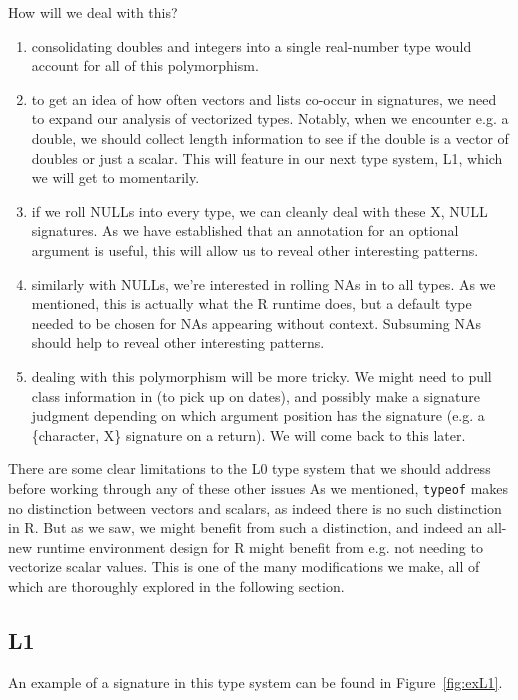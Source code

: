 \documentclass[acmsmall,10pt,review,anonymous]{acmart}\settopmatter{printfolios=true,printccs=false,printacmref=false}
\newcommand{\code}[1]{\lstinline|#1|\xspace}
\begin{document}
How will we deal with this?

\begin{enumerate}
\item consolidating doubles and integers into a single real-number type
  would account for all of this polymorphism.
\item to get an idea of how often vectors and lists co-occur in signatures,
  we need to expand our analysis of vectorized types.  Notably, when we
  encounter e.g. a double, we should collect length information to see if
  the double is a vector of doubles or just a scalar.  This will feature in
  our next type system, L1, which we will get to momentarily.
\item if we roll NULLs into every type, we can cleanly deal with these X,
  NULL signatures.  As we have established that an annotation for an
  optional argument is useful, this will allow us to reveal other
  interesting patterns.
\item similarly with NULLs, we're interested in rolling NAs in to all types.
  As we mentioned, this is actually what the R runtime does, but a default
  type needed to be chosen for NAs appearing without context.  Subsuming NAs
  should help to reveal other interesting patterns.
\item dealing with this polymorphism will be more tricky.  We might need to
  pull class information in (to pick up on dates), and possibly make a
  signature judgment depending on which argument position has the signature
  (e.g. a \{character, X\} signature on a return).  We will come back to
  this later.

\end{enumerate}

There are some clear limitations to the L0 type system that we should
address before working through any of these other issues As we mentioned,
\code{typeof} makes no distinction between vectors and scalars, as indeed
there is no such distinction in R.  But as we saw, we might benefit from
such a distinction, and indeed an all-new runtime environment design for R
might benefit from e.g. not needing to vectorize scalar values.  This is one
of the many modifications we make, all of which are thoroughly explored in
the following section.
%
%
%
%
\subsection{L1}

An example of a signature in this type system can be found in
Figure~\ref{fig:exL1}.
\end{document}
